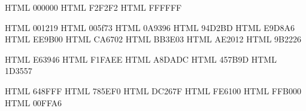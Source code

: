 
%


\definecolor{BaseBlack}       {HTML} {000000}
\definecolor{BaseGrey}        {HTML} {F2F2F2}
\definecolor{BaseWhite}       {HTML} {FFFFFF}


\definecolor{RichBlackFOGRA}  {HTML} {001219}
\definecolor{BlueSapphire}    {HTML} {005f73}
\definecolor{ViridianGreen}   {HTML} {0A9396}
\definecolor{MiddleBlueGreen} {HTML} {94D2BD}
\definecolor{MediumChampagne} {HTML} {E9D8A6}
\definecolor{Gamboge}         {HTML} {EE9B00}
\definecolor{AlloyOrange}     {HTML} {CA6702}
\definecolor{Mahogany}        {HTML} {BB3E03}
\definecolor{Rufous}          {HTML} {AE2012}
\definecolor{RubyRed}         {HTML} {9B2226}


\definecolor{ImperialRed}     {HTML} {E63946}
\definecolor{Honeydew}        {HTML} {F1FAEE}
\definecolor{PowderBlue}      {HTML} {A8DADC}
\definecolor{CeladonBlue}     {HTML} {457B9D}
\definecolor{PrussianBlue}    {HTML} {1D3557}


\definecolor{CornflowerBlue}  {HTML} {648FFF}
\definecolor{MediumSlateBlue} {HTML} {785EF0}
\definecolor{MexicanPink}     {HTML} {DC267F}
\definecolor{OrangePantone}   {HTML} {FE6100}
\definecolor{SelectiveYellow} {HTML} {FFB000}
\definecolor{Aquamarine}      {HTML} {00FFA6}
